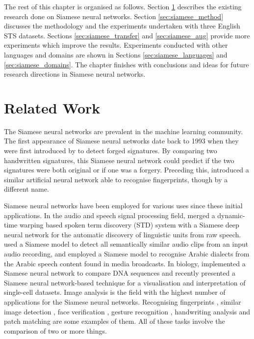 The rest of this chapter is organised as follows. Section \ref{sec:siamese_related} describes the existing research done on Siamese neural networks. Section \ref{sec:siamese_method} discusses the methodology and the experiments undertaken with three English STS datasets. Sections \ref{sec:siamese_transfer} and \ref{sec:siamese_aug} provide more experiments which improve the results. Experiments conducted with other languages and domains are shown in Sections \ref{sec:siamese_languages} and \ref{sec:siamese_domains}. The chapter finishes with conclusions and ideas for future research directions in Siamese neural networks. 

\section{Related Work}
\label{sec:siamese_related}

The Siamese neural networks are prevalent in the machine learning community. The first appearance of Siamese neural networks date back to 1993 when they were first introduced by \textcite{doi:10.1142/S0218001493000339} to detect forged signatures. By comparing two handwritten signatures, this Siamese neural network could predict if the two signatures were both original or if one was a forgery. Preceding this, \textcite{6797067} introduced a similar artificial neural network able to recognise fingerprints, though by a different name. 

Siamese neural networks have been employed for various uses since these initial applications. In the audio and speech signal processing field, \textcite{thiolliere2015hybrid} merged a dynamic-time warping based spoken term discovery (STD) system with a Siamese deep neural network for the automatic discovery of linguistic units from raw speech. \textcite{8461524} used a Siamese model to detect all semantically similar audio clips from an input audio recording, and \textcite{8268960} employed a Siamese model to recognise Arabic dialects from the Arabic speech content found in media broadcasts. In biology, \textcite{10.1093/bioinformatics/bty887} implemented a Siamese neural network to compare DNA sequences and recently \textcite{Szubert2019} presented a Siamese neural network-based technique for a visualisation and interpretation of single-cell datasets. Image analysis is the field with the highest number of applications for the Siamese neural networks. Recognising fingerprints \autocite{6797067}, similar image detection \autocite{1467314,rs10020355,21be1428c6a44fb7a32d49ba83126bcb,6976727,6636646}, face verification \autocite{Taigman_2014_CVPR}, gesture recognition \autocite{7163112}, handwriting analysis \autocite{8269987} and patch matching \autocite{HANIF201954} are some examples of them. All of these tasks involve the comparison of two or more things.

